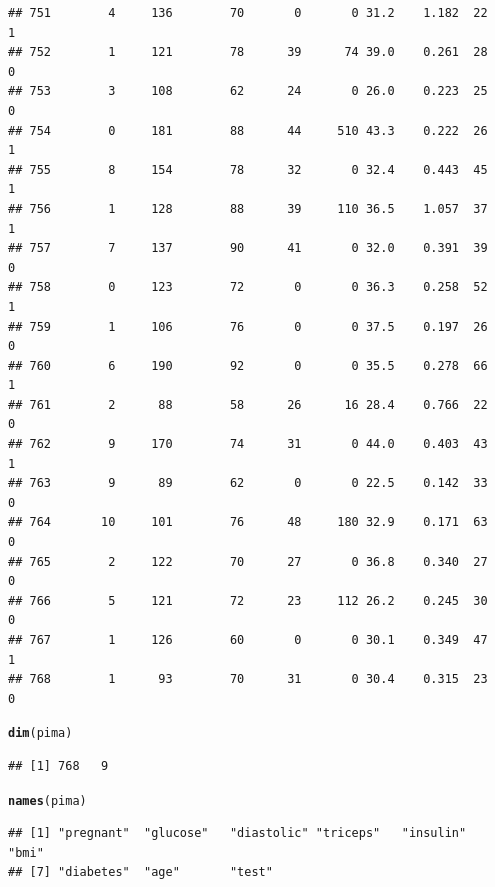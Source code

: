 \documentclass[11pt, a4paper]{article}\usepackage[]{graphicx}\usepackage[]{xcolor}
\makeatletter
\newcommand{\hlstd}[1]{\textcolor[rgb]{0.345,0.345,0.345}{#1}}%
\newcommand{\hlkwd}[1]{\textcolor[rgb]{0.737,0.353,0.396}{\textbf{#1}}}%
\newenvironment{kframe}{%
 \def\at@end@of@kframe{}%
 \ifinner\ifhmode%
  \def\at@end@of@kframe{\end{minipage}}%
  \begin{minipage}{\columnwidth}%
 \fi\fi%
 \def\FrameCommand##1{\hskip\@totalleftmargin \hskip-\fboxsep
 \colorbox{shadecolor}{##1}\hskip-\fboxsep
     \hskip-\linewidth \hskip-\@totalleftmargin \hskip\columnwidth}%
 \MakeFramed {\advance\hsize-\width
   \@totalleftmargin\z@ \linewidth\hsize
   \@setminipage}}%
 {\par\unskip\endMakeFramed%
 \at@end@of@kframe}
\newenvironment{knitrout}{}{} %
\makeatother
\begin{document}
\begin{knitrout}
\begin{kframe}
\begin{verbatim}
## 751        4     136        70       0       0 31.2    1.182  22    1
## 752        1     121        78      39      74 39.0    0.261  28    0
## 753        3     108        62      24       0 26.0    0.223  25    0
## 754        0     181        88      44     510 43.3    0.222  26    1
## 755        8     154        78      32       0 32.4    0.443  45    1
## 756        1     128        88      39     110 36.5    1.057  37    1
## 757        7     137        90      41       0 32.0    0.391  39    0
## 758        0     123        72       0       0 36.3    0.258  52    1
## 759        1     106        76       0       0 37.5    0.197  26    0
## 760        6     190        92       0       0 35.5    0.278  66    1
## 761        2      88        58      26      16 28.4    0.766  22    0
## 762        9     170        74      31       0 44.0    0.403  43    1
## 763        9      89        62       0       0 22.5    0.142  33    0
## 764       10     101        76      48     180 32.9    0.171  63    0
## 765        2     122        70      27       0 36.8    0.340  27    0
## 766        5     121        72      23     112 26.2    0.245  30    0
## 767        1     126        60       0       0 30.1    0.349  47    1
## 768        1      93        70      31       0 30.4    0.315  23    0
\end{verbatim}
\end{kframe}
\end{knitrout}

\begin{knitrout}
\color{fgcolor}\begin{kframe}
\begin{alltt}
\hlkwd{dim}\hlstd{(pima)}
\end{alltt}
\begin{verbatim}
## [1] 768   9
\end{verbatim}
\end{kframe}
\end{knitrout}

\begin{knitrout}
\color{fgcolor}\begin{kframe}
\begin{alltt}
\hlkwd{names}\hlstd{(pima)}
\end{alltt}
\begin{verbatim}
## [1] "pregnant"  "glucose"   "diastolic" "triceps"   "insulin"   "bmi"      
## [7] "diabetes"  "age"       "test"
\end{verbatim}
\end{kframe}
\end{knitrout}
\end{document}
